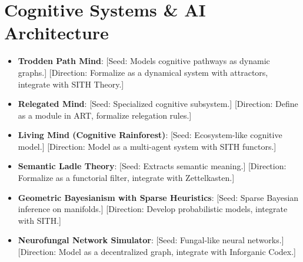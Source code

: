 \documentclass[11pt,oneside]{memoir}
\theoremstyle{plain}
\begin{document}
\section{Cognitive Systems \& AI Architecture}
\begin{itemize}
    \item \textbf{Trodden Path Mind}: [Seed: Models cognitive pathways as dynamic graphs.] [Direction: Formalize as a dynamical system with attractors, integrate with SITH Theory.] \cite{maclane}
    \item \textbf{Relegated Mind}: [Seed: Specialized cognitive subsystem.] [Direction: Define as a module in ART, formalize relegation rules.]
    \item \textbf{Living Mind (Cognitive Rainforest)}: [Seed: Ecosystem-like cognitive model.] [Direction: Model as a multi-agent system with SITH functors.] \cite{lindenmayer}
    \item \textbf{Semantic Ladle Theory}: [Seed: Extracts semantic meaning.] [Direction: Formalize as a functorial filter, integrate with Zettelkasten.]
    \item \textbf{Geometric Bayesianism with Sparse Heuristics}: [Seed: Sparse Bayesian inference on manifolds.] [Direction: Develop probabilistic models, integrate with SITH.]
    \item \textbf{Neurofungal Network Simulator}: [Seed: Fungal-like neural networks.] [Direction: Model as a decentralized graph, integrate with Inforganic Codex.]
\end{itemize}

\backmatter


\end{document}
